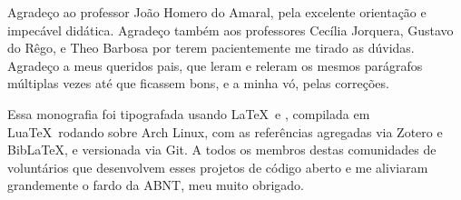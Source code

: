 \begin{agradecimentos}
Agradeço ao professor João Homero do Amaral, pela excelente orientação e impecável didática.
Agradeço também aos professores Cecília Jorquera, Gustavo do Rêgo, e Theo Barbosa por terem pacientemente me tirado as dúvidas.
Agradeço a meus queridos pais, que leram e releram os mesmos parágrafos múltiplas vezes até que ficassem bons, e a minha vó, pelas correções.

Essa monografia foi tipografada usando \LaTeX\ e \abnTeX, compilada em Lua\TeX\ rodando sobre Arch Linux, com as referências agregadas via Zotero e Bib\LaTeX{}, e versionada via Git.
A todos os membros destas comunidades de voluntários que desenvolvem esses projetos de código aberto e me aliviaram grandemente o fardo da ABNT, meu muito obrigado.
\end{agradecimentos}
